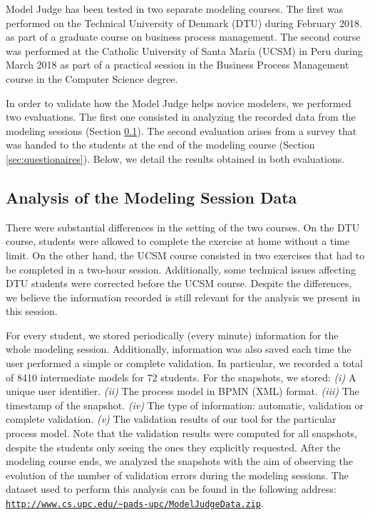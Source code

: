 
Model Judge has been tested in two separate modeling courses. The first was performed on the Technical University of Denmark (DTU) during February 2018. as part of a graduate course on business process management. 
The second course was performed at the Catholic University of Santa Mar\'ia (UCSM) in Peru during March 2018 as part of a practical session in the Business Process Management course in the Computer Science degree.

In order to validate how the Model Judge helps novice modelers, we performed two evaluations.  The first one consisted in analyzing the recorded data from the modeling sessions (Section \ref{sec:data_analysis}). The second evaluation arises from a survey that was handed to the students at the end of the modeling course (Section \ref{sec:questionaires}). Below, we detail the results obtained in both evaluations.

\subsection{Analysis of the Modeling Session Data}
\label{sec:data_analysis}
There were substantial differences in the setting of the two courses. On the DTU course, students were allowed to complete the exercise at home without a time limit. On the other hand, the UCSM course consisted in two exercises that had to be completed in a two-hour session.
Additionally, some technical issues affecting DTU students were corrected before the UCSM course. Despite the differences, we believe the information recorded is still relevant for the analysis we present in this session. 

For every student, we stored periodically (every minute) information for the whole modeling session. Additionally, information was also saved each time the user performed a simple or complete validation. In particular, we recorded a total of 8410 intermediate models for 72 students. For the snapshots, we stored: \textit{(i)} A unique user identifier. \textit{(ii)} The process model in BPMN (XML) format. \textit{(iii)} The timestamp of the snapshot. \textit{(iv)} The type of information: automatic, validation or complete validation. \textit{(v)} The validation results of our tool for the particular process model. Note that the validation results were computed for all snapshots, despite the students only seeing the ones they explicitly requested. 
After the modeling course ends, we analyzed the snapshots with the aim of observing the evolution of the number of validation errors during the modeling sessions. The dataset used to perform this analysis can be found in the following address: \texttt{\url{http://www.cs.upc.edu/~pads-upc/ModelJudgeData.zip}}.

